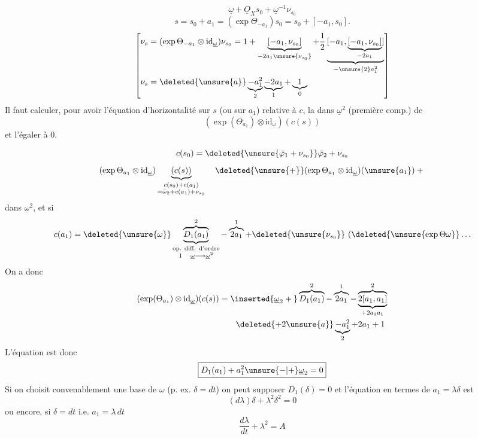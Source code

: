 \[
\underline\omega+\underline O_Xs_0+\underline\omega^{-1}\nu_{s_0}
\]
\[
s=s_0+a_1=(\exp\Theta_{-a_1})s_0=s_0+[-a_1,s_0].
\]
\[
\left[\begin{aligned}
\nu_s&=(\exp\Theta_{-a_1}\otimes\mathrm{id}_{\underline\omega})\nu_{s_0}
=1+\underbrace{[-a_1,\nu_{s_0}]}_{-2a_1\unsure{\nu_{s_0}}}
+\frac12\underbrace{[-a_1,\underbrace{[-a_1,\nu_{s_0}]}_{-2a_1}]}_{-\unsure{2}a_1^2}\\
\nu_s&=\deleted{\unsure{a}}\underbrace{-a_1^2}_{2}\underbrace{-2a_1}_{1}+\underbrace{1}_{0}
\end{aligned}\right]
\]
Il faut calculer, pour avoir l'équation d'horizontalité sur $s$ (ou sur $a_1$) relative à $c$, la  dans $\underline\omega^2$ (première comp.) de
\[
(\exp(\Theta_{a_1})\otimes\mathrm{id}_{\underline\omega})(c(s))
\]
et l'égaler à 0.

\[
c(s_0)=\deleted{\unsure{\bar\varphi_1+\nu_{s_0}}}\bar\varphi_2+\nu_{s_0}
\]
\[
(\exp\Theta_{a_1}\otimes\mathrm{id}_{\underline\omega})
\underbrace{(c(s))}_{\substack{c(s_0)+c(a_1)\\=\bar\omega_2+c(a_1)+\nu_{s_0}}}
\quad\deleted{\unsure{+}}(\exp\Theta_{a_1}\otimes\mathrm{id}_{\underline\omega})(\unsure{a_1})+{}
\]
 dans $\underline\omega^2$, et si
\[
c(a_1)=\deleted{\unsure{\omega}}\underbrace{\overbrace{D_1(a_1)}^{2}}_{\substack{\text{op. diff. d'ordre}\\1\quad\underline\omega\longrightarrow\underline\omega^2}}
-\overbrace{2a_1}^{1}+\deleted{\unsure{\nu_{s_0}}}\ (\deleted{\unsure{\exp\Theta\omega}}\ldots
\]
On a donc
\[
\begin{aligned}
(\exp(\Theta_{a_1})\otimes\mathrm{id}_{\underline\omega})(c(s))
&=\inserted{\underline\omega_2+{}}\overbrace{D_1(a_1)}^{2}-\overbrace{2a_1}^{1}
-\underbrace{\overbrace{2[a_1,a_1]}^{2}}_{+2a_1a_1}\\
&\qquad\deleted{+2\unsure{a}}\underbrace{-a_1^2}_{2}+2a_1+1
\end{aligned}
\]
L'équation est donc
\[
\boxed{D_1(a_1)+a_1^2\unsure{-|+}\underline\omega_2=0}
\]
Si on choisit convenablement une base de $\omega$ (p. ex. $\delta=dt$) on peut supposer $D_1(\delta)=0$ et l'équation en termes de $a_1=\lambda\delta$ est
\[
(d\lambda)\delta+\lambda^2\delta^2=0
\]
ou encore, si $\delta=dt$ i.e. $a_1=\lambda\,dt$
\[
\boxed{\frac{d\lambda}{dt}+\lambda^2=A}
\]
